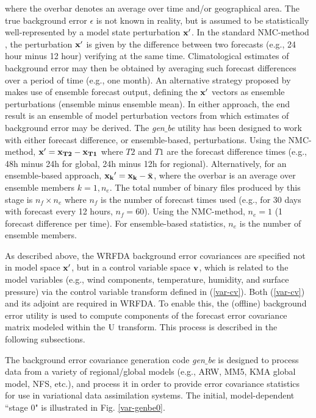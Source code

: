 \noindent where the overbar denotes an average over time and/or geographical area. The true 
background error $\epsilon$ is not known in reality, but is assumed to be statistically
well-represented by a model state perturbation ${\bf x'}$. In the standard NMC-method
\citep{parrish92}, the perturbation ${\bf x'}$ is given by the difference between 
two forecasts (e.g., 24 hour minus 12 hour) verifying at the same time. Climatological 
estimates of background error may then be obtained by averaging such forecast 
differences over a period of time (e.g., one month). An alternative strategy proposed by 
\citep{fisher03} makes use of ensemble forecast output, defining the ${\bf x'}$ vectors as 
ensemble perturbations (ensemble minus ensemble mean). In either approach, the end 
result is an ensemble of model perturbation vectors from which estimates of 
background error may be derived. The {\it gen$\_$be} utility has been designed to work with 
either forecast difference, or ensemble-based, perturbations.
Using the NMC-method, ${\bf x}'={\bf x_{T2}}-{\bf x_{T1}}$ where $T2$ and $T1$ 
are the forecast difference times (e.g., 48h minus 24h for global, 24h minus 12h for regional). 
Alternatively, for an ensemble-based approach, ${\bf x_{k}}'={\bf x_{k}}-\bar{\bf 
x}$, where the overbar is an average over ensemble members $k=1,n_{e}$. The total 
number of binary files produced by this stage is $n_{f} \times n_e$ where $n_f$ is the 
number of forecast times used (e.g., for 30 days with forecast every 12 hours, $n_f=60$). 
Using the NMC-method, $n_e=1$ (1 forecast difference per time). For ensemble-based 
statistics, $n_e$ is the number of ensemble members.

As described above, the WRFDA background error covariances are specified not in 
model space ${\bf x'}$, but in a control variable space ${\bf v}$, which is related to the model variables 
(e.g., wind components, temperature, humidity, and surface pressure) via the control 
variable transform defined in (\ref{var-cv}). Both (\ref{var-cv}) and 
its adjoint are required in WRFDA. To enable this, the (offline) background error utility is used
to compute components of the forecast error covariance matrix modeled within the 
${\rm U}$ transform. This process is described in the following subsections.

The background error covariance generation code {\it gen$\_$be} is designed to process
data from a variety of regional/global models (e.g., ARW, MM5, KMA global model, 
NFS, etc.), and process it in order to provide error 
covariance statistics for use in variational data assimilation systems. The initial, 
model-dependent ``stage 0" is illustrated in Fig. \ref{var-genbe0}. 

